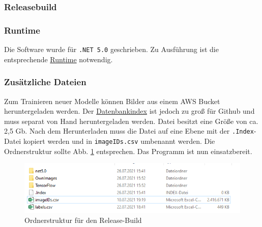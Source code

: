\documentclass[doktyp=parbeit]{TUBAFarbeiten}
\begin{document}
\subsubsection{Releasebuild}
\subsubsection*{Runtime}
Die Software wurde für \texttt{.NET 5.0} geschrieben. Zu Ausführung ist die entsprechende \href{https://dotnet.microsoft.com/download}{Runtime} notwendig.
\subsubsection*{Zusätzliche Dateien}
Zum Trainieren neuer Modelle können Bilder aus einem AWS Bucket heruntergeladen werden. Der \href{https://storage.googleapis.com/openimages/v6/oidv6-train-annotations-human-imagelabels.csv}{Datenbankindex} ist jedoch zu groß für Github und muss separat von Hand heruntergeladen werden. Datei besitzt eine Größe von ca. 2,5 Gb. Nach dem Herunterladen muss die Datei auf eine Ebene mit der \texttt{.Index}-Datei kopiert werden und in \texttt{imageIDs.csv} umbenannt werden. Die Ordnerstruktur sollte Abb. \ref{fig:release} entsprechen. Das Programm ist nun einsatzbereit.
\begin{figure}
	\centering
	\includegraphics[width=0.7\linewidth]{Bilder/Release}
	\caption{Ordnerstruktur für den Release-Build}
	\label{fig:release}
\end{figure}
\end{document}
